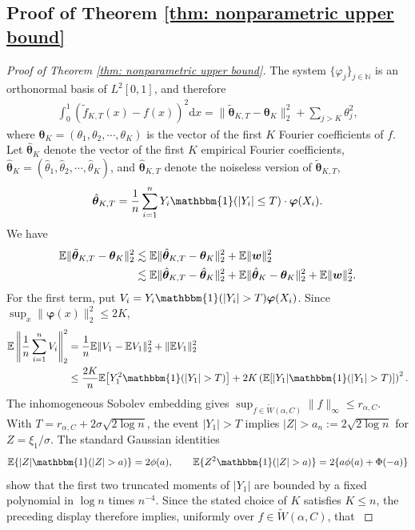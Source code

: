 \documentclass[letterpaper,12pt]{article}
\renewcommand{\d}{\mathrm{d}}
\numberwithin{equation}{section}
\theoremstyle{plain}
\numberwithin{Theorem}{section}
\numberwithin{proposition}{section}
\numberwithin{Lemma}{section}
{
	\theoremstyle{definition}
	\newtheorem{Definition}{Definition}
	\newtheorem{example}{Example}
	\numberwithin{example}{section}
	\newtheorem{fact}{Fact}
	\numberwithin{fact}{section}
	\newtheorem{remark}{Remark}
}
\newcommand{\rev}[1]{#1}
\newcommand{\1}{\mathbbm{1}}
\def\bth{{\boldsymbol{\theta}}}
\def\E{\mathbb{E}}
\begin{document}
\subsection{Proof of Theorem \ref{thm: nonparametric upper bound}}\label{sec: proof of thm: nonparametric upper bound}
\begin{proof}[Proof of Theorem \ref{thm: nonparametric upper bound}]
	The system $\{\varphi_j\}_{j \in \mathbb N}$ is an orthonormal basis of $L^2[0,1]$, and therefore
	\begin{align}\label{eq: nonparametric estimator integrated risk decomposition}
			\int_0^1 (\tilde f_{K, T}(x) - f(x))^2 \d x = \|\tilde\bth_{K, T} - \bth_K\|_2^2 + \sum_{j > K} \theta_j^2,
	\end{align}
	where $\bth_K = (\theta_1, \theta_2, \cdots, \theta_K)$ is the vector of the first $K$ Fourier coefficients of $f$. Let $\hat\bth_K$ denote the vector of the first $K$ empirical Fourier coefficients, \rev{$\hat\bth_K = (\hat\theta_1, \hat\theta_2, \cdots, \hat\theta_K)$}, and $\hat\bth_{K, T}$ denote the noiseless version of $\tilde\bth_{K, T}$,
	\begin{align*}
		\hat\bth_{K, T} = \frac{1}{n} \sum_{i=1}^n Y_i\1(|Y_i| \leq T) \cdot \bm \varphi(X_i).
	\end{align*}
	We have
	\begin{align}
		\E\|\tilde\bth_{K, T} - \bth_K\|_2^2 &\lesssim \E \|\hat\bth_{K, T} - \bth_K\|_2^2 + \E \|\bm w \|_2^2 \notag\\
		&\lesssim \E \|\hat\bth_{K, T} - \hat\bth_K\|_2^2 + \E \|\hat\bth_K - \bth_K\|_2^2 + \E \|\bm w \|_2^2. \label{eq: nonparametric estimator coefficient risk decomposition}
	\end{align}
	{For the first term, put $V_i=Y_i\1(|Y_i|>T)\bm\varphi(X_i)$. Since $\sup_x\|\bm\varphi(x)\|_2^2\leq2K$,
	\begin{align*}
		\E\left\|\frac1n\sum_{i=1}^nV_i\right\|_2^2
		&=\frac1n\E\|V_1-\E V_1\|_2^2+\|\E V_1\|_2^2\\
		&\leq\frac{2K}{n}\E\!\left[Y_1^2\1(|Y_1|>T)\right]+2K\left(\E\!\left[|Y_1|\1(|Y_1|>T)\right]\right)^2.
	\end{align*}
		The inhomogeneous Sobolev embedding gives $\sup_{f\in\tilde W(\alpha,C)}\|f\|_\infty\leq r_{\alpha,C}$. With $T=r_{\alpha,C}+2\sigma\sqrt{2\log n}$, the event $|Y_1|>T$ implies $|Z|>a_n:=2\sqrt{2\log n}$ for $Z=\xi_1/\sigma$. The standard Gaussian identities
		\[
		\E\{|Z|\1(|Z|>a)\}=2\phi(a),\qquad
		\E\{Z^2\1(|Z|>a)\}=2\{a\phi(a)+\Phi(-a)\}
		\]
		show that the first two truncated moments of $|Y_1|$ are bounded by a fixed polynomial in $\log n$ times $n^{-4}$. Since the stated choice of $K$ satisfies $K\leq n$, the preceding display therefore implies, uniformly over $f\in\tilde W(\alpha,C)$, that
}
\end{proof}
\end{document}
